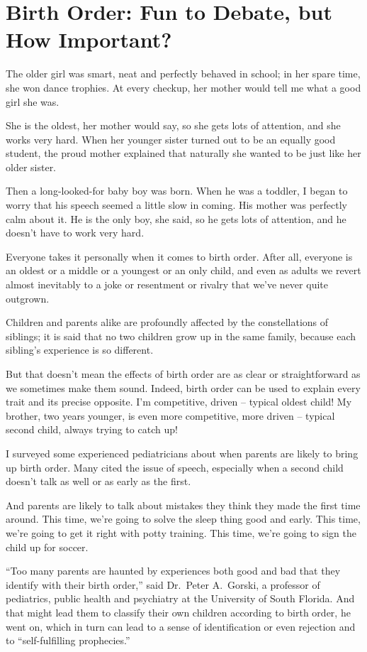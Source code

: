 ﻿\documentclass[12pt]{article}
\begin{document}
\section{Birth Order: Fun to Debate, but How Important?}

The older girl was smart, neat and perfectly behaved in school; in her spare time, she won dance
trophies\cite{trophy}. At every checkup, her mother would tell me what a good girl she was.

She is the oldest, her mother would say, so she gets lots of attention, and she works very hard.
When her younger sister turned out to be an equally good student, the proud mother explained that
naturally she wanted to be just like her older sister.

Then a long-looked-for baby boy was born. When he was a toddler, I began to worry that his speech
seemed a little slow in coming. His mother was perfectly calm about it. He is the only boy, she
said, so he gets lots of attention, and he doesn't have to work very hard.

Everyone takes it personally when it comes to birth order. After all, everyone is an oldest or a
middle or a youngest or an only child, and even as adults we revert almost inevitably to a joke or
resentment or rivalry that we've never quite outgrown.

Children and parents alike are profoundly affected by the constellations of siblings; it is said
that no two children grow up in the same family, because each sibling's experience is so different.

But that doesn't mean the effects of birth order are as clear or straightforward as we sometimes
make them sound. Indeed, birth order can be used to explain every trait and its precise opposite.
I'm competitive, driven -- typical oldest child! My brother, two years younger, is even more
competitive, more driven -- typical second child, always trying to catch up!

I surveyed some experienced pediatricians about when parents are likely to bring up birth order.
Many cited the issue of speech, especially when a second child doesn't talk as well or as early as
the first.

And parents are likely to talk about mistakes they think they made the first time around. This time,
we're going to solve the sleep thing good and early. This time, we're going to get it right with
potty training. This time, we're going to sign the child up for soccer.

``Too many parents are haunted by experiences both good and bad that they identify with their birth
order,'' said Dr.~Peter A.~Gorski, a professor of pediatrics, public health and psychiatry at the
University of South Florida. And that might lead them to classify their own children according to
birth order, he went on, which in turn can lead to a sense of identification or even rejection and
to ``self-fulfilling prophecies.''
\end{document}
